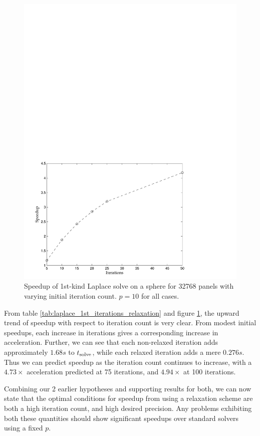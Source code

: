 \begin{figure}[h]
	\centering
	\includegraphics[width=14cm]{img/LaplaceRelaxationIterations.pdf}
	\caption{Speedup of 1st-kind Laplace solve on a sphere for 32768 panels with varying initial iteration count. $p=10$ for all cases.}
	\label{fig:laplace_iterations_speedup}
\end{figure}

From table \ref{tab:laplace_1st_iterations_relaxation} and figure \ref{fig:laplace_iterations_speedup}, the upward trend of speedup with respect to iteration count is very clear. From modest initial speedups, each increase in iterations gives a corresponding increase in acceleration. Further, we can see that each non-relaxed iteration adds approximately $1.68s$ to $t_{\text{solve}}$, while each relaxed iteration adds a mere $0.276s$. Thus we can predict speedup as the iteration count continues to increase, with a $4.73\times$ acceleration predicted at 75 iterations, and $4.94\times$ at 100 iterations.

Combining our 2 earlier hypotheses and supporting results for both, we can now state that the optimal conditions for speedup from using a relaxation scheme are both a high iteration count, and high desired precision. Any problems exhibiting both these quantities should show significant speedups over standard solvers using a fixed $p$.

